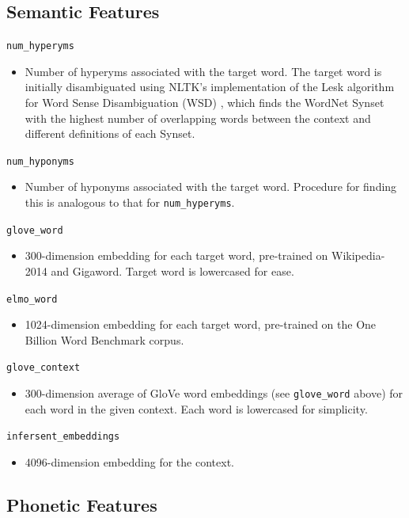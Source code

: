 \documentclass[11pt,a4paper]{article}
\begin{document}
\subsection{Semantic Features}

\texttt{num\_hyperyms}
\begin{itemize}
  \item Number of hyperyms associated with the target word. The target word is initially disambiguated using NLTK's implementation of the Lesk algorithm for Word Sense Disambiguation (WSD) \citep{10.1145318723.318728}, which finds the WordNet Synset with the highest number of overlapping words between the context and different definitions of each Synset.
\end{itemize}
\texttt{num\_hyponyms}
\begin{itemize}
  \item Number of hyponyms associated with the target word. Procedure for finding this is analogous to that for \texttt{num\_hyperyms}.
\end{itemize}
\texttt{glove\_word}
\begin{itemize}
  \item 300-dimension embedding for each target word, pre-trained on Wikipedia-2014 and Gigaword. Target word is lowercased for ease.
\end{itemize}
\texttt{elmo\_word}
\begin{itemize}
  \item 1024-dimension embedding for each target word, pre-trained on the One Billion Word Benchmark corpus.
\end{itemize}
\texttt{glove\_context}
\begin{itemize}
  \item 300-dimension average of GloVe word embeddings (see \texttt{glove\_word} above) for each word in the given context. Each word is lowercased for simplicity.
\end{itemize}
\texttt{infersent\_embeddings}
\begin{itemize}
  \item 4096-dimension embedding for the context.
\end{itemize}

\subsection{Phonetic Features}
\end{document}
